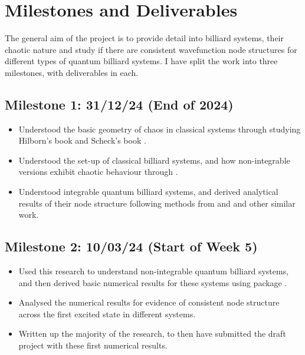 \documentclass[12pt,a4paper]{amsart}
\begin{document}
\section{Milestones and Deliverables}

The general aim of the project is to provide detail into billiard systems, their chaotic nature and study if there are consistent wavefunction node structures for different types of quantum billiard systems. I have split the work into three milestones, with deliverables in each.

\subsection*{Milestone 1: 31/12/24 (End of 2024)}
\begin{itemize}
    \item Understood the basic geometry of chaos in classical systems through studying Hilborn's book \cite{HILBORN} and Scheck's book \cite{SCHECK}.
    \item Understood the set-up of classical billiard systems, and how non-integrable versions exhibit chaotic behaviour through \cite{KORSCH}.
    \item Understood integrable quantum billiard systems, and derived analytical results of their node structure following methods from \cite{ARND} and \cite{CASATI} and other similar work.
\end{itemize}

\subsection*{Milestone 2: 10/03/24 (Start of Week 5)}
\begin{itemize}
    \item Used this research to understand non-integrable quantum billiard systems, and then derived basic numerical results for these systems using package \cite{CODE}.
    \item Analysed the numerical results for evidence of consistent node structure across the first excited state in different systems.
    \item Written up the majority of the research, to then have submitted the draft project with these first numerical results.
\end{itemize}
\end{document}
